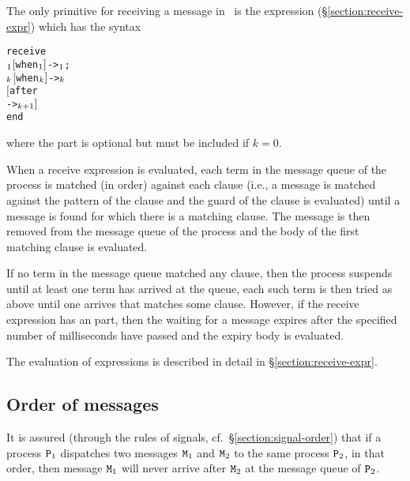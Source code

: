 \label{section:receiving-messages}

The only primitive for receiving a message in \Erlang\
is the  expression
(\S\ref{section:receive-expr})
which has the syntax
\begin{alltt}
receive
    \(\sb{1}\) \([\)when \(\sb{1}]\) -> \(\sb{1}\) ;
    \tdots
    \(\sb{k}\) \([\)when \(\sb{k}]\) -> \(\sb{k}\)
\([\)after
     -> \(\sb{k+1}]\)
end
\end{alltt}
where the  part is optional but must be included if $k=0$.

When a receive expression is evaluated, each term in the message queue
of the process is matched (in order) against each clause (i.e., a
message is matched against the pattern of the clause and the guard of
the clause is evaluated) until a message is found for which there is a
matching clause. The message is then removed from the message queue of
the process and the body of the first matching clause is evaluated.

If no term in the message queue matched any clause, then the process suspends until
at least one term has arrived at the queue, each such term is then tried as above until one arrives
that matches some clause. However, if the receive expression has an \T{after} part,
then the waiting for a message expires\index{expiry!of \T{receive} expression} after
the specified number of milliseconds have passed
and the expiry body is evaluated.

The evaluation of  expressions is described in detail in
\S\ref{section:receive-expr}.

\subsection{Order of messages}

It is assured (through the rules of signals, cf.~\S\ref{section:signal-order})
that if a process ${\tt{\sl P}}_1$ dispatches two messages
${\tt{\sl M}}_1$ and
${\tt{\sl M}}_2$ to the same process ${\tt{\sl P}}_2$, in that order, then message ${\tt{\sl M}}_1$ will never
arrive after ${\tt{\sl M}}_2$ at the message queue of ${\tt{\sl P}}_2$.

